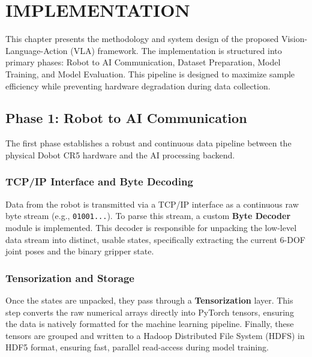 \chapter{IMPLEMENTATION}
\label{chap:implementation}

This chapter presents the methodology and system design of the proposed Vision-Language-Action (VLA) framework. The implementation is structured into primary phases: Robot to AI Communication, Dataset Preparation, Model Training, and Model Evaluation. This pipeline is designed to maximize sample efficiency while preventing hardware degradation during data collection.

\section{Phase 1: Robot to AI Communication}
\label{sec:phase1_communication}

The first phase establishes a robust and continuous data pipeline between the physical Dobot CR5 hardware and the AI processing backend. 

\subsection{TCP/IP Interface and Byte Decoding}
Data from the robot is transmitted via a TCP/IP interface as a continuous raw byte stream (e.g., \texttt{01001...}). To parse this stream, a custom \textbf{Byte Decoder} module is implemented. This decoder is responsible for unpacking the low-level data stream into distinct, usable states, specifically extracting the current 6-DOF joint poses and the binary gripper state.

\subsection{Tensorization and Storage}
Once the states are unpacked, they pass through a \textbf{Tensorization} layer. This step converts the raw numerical arrays directly into PyTorch tensors, ensuring the data is natively formatted for the machine learning pipeline. Finally, these tensors are grouped and written to a Hadoop Distributed File System (HDFS) in HDF5 format, ensuring fast, parallel read-access during model training.

